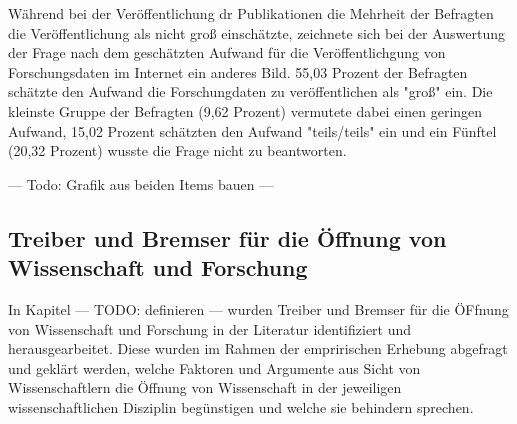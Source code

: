 Während bei der Veröffentlichung dr Publikationen die Mehrheit der Befragten die Veröffentlichung als nicht groß einschätzte, zeichnete sich bei der Auswertung der Frage nach dem geschätzten Aufwand für die Veröffentlichgung von Forschungsdaten im Internet ein anderes Bild. 55,03 Prozent der Befragten schätzte den Aufwand die Forschungdaten zu veröffentlichen als "groß" ein. Die kleinste Gruppe der Befragten (9,62 Prozent) vermutete dabei einen geringen Aufwand, 15,02 Prozent schätzten den Aufwand "teils/teils" ein und ein Fünftel (20,32 Prozent) wusste die Frage nicht zu beantworten.

--- Todo: Grafik aus beiden Items bauen ---

\subsection{Treiber und Bremser für die Öffnung von Wissenschaft und Forschung}

In Kapitel --- TODO: definieren --- wurden Treiber und Bremser für die ÖFfnung von Wissenschaft und Forschung in der Literatur identifiziert und herausgearbeitet. Diese wurden im Rahmen der empririschen Erhebung abgefragt und geklärt werden, welche Faktoren und Argumente aus Sicht von Wissenschaftlern die Öffnung von Wissenschaft in der jeweiligen wissenschaftlichen Disziplin begünstigen und welche sie behindern sprechen. 

